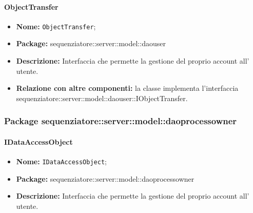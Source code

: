 \paragraph{ObjectTransfer}
	\begin{itemize}
		\item \textbf{Nome:} \texttt{ObjectTransfer};
		\item \textbf{Package:} sequenziatore::server::model::daouser
		\item \textbf{Descrizione:} Interfaccia che permette la gestione del proprio account all' utente.
		\item \textbf{Relazione con altre componenti:} la classe implementa l'interfaccia sequenziatore::server::model::daouser::IObjectTransfer.
	\end{itemize}
\subsubsection{Package sequenziatore::server::model::daoprocessowner}
\paragraph{IDataAccessObject}
	\begin{itemize}
		\item \textbf{Nome:} \texttt{IDataAccessObject};
		\item \textbf{Package:} sequenziatore::server::model::daoprocessowner
		\item \textbf{Descrizione:} Interfaccia che permette la gestione del proprio account all' utente.
	\end{itemize}
